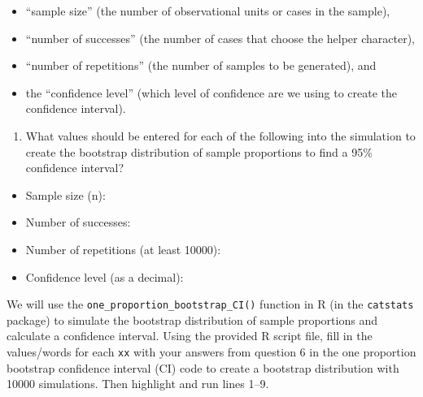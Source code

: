 \documentclass[
]{report}
\providecommand{\tightlist}{%
  \setlength{\itemsep}{0pt}\setlength{\parskip}{0pt}}
\begin{document}
\begin{itemize}
\tightlist
\item
  ``sample size'' (the number of observational units or cases in the sample),
\item
  ``number of successes'' (the number of cases that choose the helper character),
\item
  ``number of repetitions'' (the number of samples to be generated), and
\item
  the ``confidence level'' (which level of confidence are we using to create the confidence interval).
\end{itemize}

\begin{enumerate}
\def\labelenumi{\arabic{enumi}.}
\setcounter{enumi}{5}
\tightlist
\item
  What values should be entered for each of the following into the simulation to create the bootstrap distribution of sample proportions to find a 95\% confidence interval?
  \vspace{1mm}
\end{enumerate}

\begin{itemize}
\tightlist
\item
  Sample size (n):
\end{itemize}

\vspace{.1in}

\begin{itemize}
\tightlist
\item
  Number of successes:
\end{itemize}

\vspace{.1in}

\begin{itemize}
\tightlist
\item
  Number of repetitions (at least 10000):
\end{itemize}

\vspace{.1in}

\begin{itemize}
\tightlist
\item
  Confidence level (as a decimal):
\end{itemize}

\vspace{.1in}

We will use the \texttt{one\_proportion\_bootstrap\_CI()} function in R (in the \texttt{catstats} package) to simulate the bootstrap distribution of sample proportions and calculate a confidence interval. Using the provided R script file, fill in the values/words for each \texttt{xx} with your answers from question 6 in the one proportion bootstrap confidence interval (CI) code to create a bootstrap distribution with 10000 simulations. Then highlight and run lines 1--9.
\end{document}
